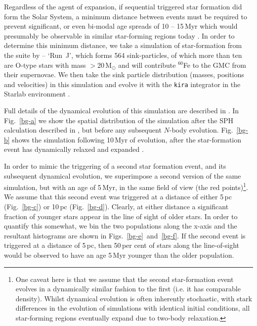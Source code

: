 \documentclass[useAMS,usenatbib,usegraphicx]{mn2e}
\begin{document}
Regardless of the agent of expansion, if sequential triggered star formation did form the Solar System, a minimum distance between events must be required to prevent significant, or even bi-modal age spreads of 10 -- 15\,Myr  which would presumably be observable in similar star-forming regions today \citep{Preibisch07}.  In order to determine this minimum distance, we take a simulation of star-formation from the suite by \citet{Dale14} -- `Run~J', which forms 564 sink-particles, of which more than ten are O-type stars with mass $>$20\,M$_\odot$ and will contribute $^{60}$Fe to the GMC from their supernovae. We then take the sink particle distribution (masses, positions and velocities) in this simulation and evolve it with the \texttt{kira} integrator in the Starlab environment \citep{Zwart99,Zwart01}. 

Full details of the dynamical evolution of this simulation are described in \citet*{Parker15a}. In Fig.~\ref{bg-a} we show the spatial distribution of the simulation after the SPH calculation described in \citet{Dale14}, but before any subsequent $N$-body evolution.  Fig.~\ref{bg-b} shows the simulation following 10\,Myr of evolution, after the star-formation event has dynamically relaxed and expanded \citep[the median stellar density in this simulation decreases from 51\,stars\,pc$^{-2}$ to 2.5\,stars\,pc$^{-2}$ in 10\,Myr,][]{Parker15a}.

In order to mimic the triggering of a second star formation event, and its subsequent dynamical evolution, we superimpose a second version of the same simulation, but with an age of 5\,Myr, in the same field of view (the red points)\footnote{One caveat here is that we assume that the second star-formation event evolves in a dynamically similar fashion to the first (i.e. it has comparable density). Whilst dynamical evolution is often inherently stochastic, with stark differences in the evolution of simulations with identical initial conditions, all star-forming regions eventually expand due to two-body relaxation.}. We assume that this second event was triggered at a distance of either 5\,pc (Fig.~\ref{bg-c}) or 10\,pc (Fig.~\ref{bg-d}). Clearly, at either distance a significant  fraction of younger stars appear in the line of sight of older stars. In order to quantify this somewhat, we bin the two populations along the x-axis and the resultant histograms are shown in Figs.~\ref{bg-e}~and~\ref{bg-f}. If the second event is triggered at a distance of 5\,pc, then 50\,per cent of stars along the line-of-sight would be observed to have an age 5\,Myr younger than the older population.
\end{document}
